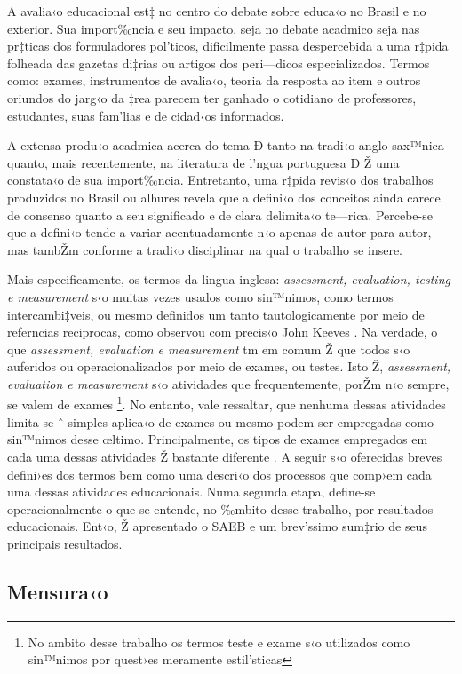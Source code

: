 \documentclass[a4paper, 12pt]{article}
\begin{document}
A avalia‹o educacional est‡ no centro do debate sobre educa‹o no Brasil e no exterior. Sua import‰ncia e seu impacto, seja no debate acadmico seja nas pr‡ticas dos formuladores pol’ticos, dificilmente passa despercebida a uma r‡pida folheada das gazetas di‡rias ou artigos dos peri—dicos especializados. Termos como: exames, instrumentos de avalia‹o, teoria da resposta ao item e outros oriundos do jarg‹o da ‡rea parecem ter ganhado o cotidiano de professores, estudantes, suas fam’lias e de cidad‹os informados. 

A extensa produ‹o acadmica acerca do tema Ð tanto na tradi‹o anglo-sax™nica quanto, mais recentemente, na literatura de l’ngua portuguesa Ð Ž uma constata‹o de sua import‰ncia. Entretanto, uma r‡pida revis‹o dos trabalhos produzidos no Brasil ou alhures revela que a defini‹o dos conceitos ainda carece de consenso quanto a seu significado e de clara delimita‹o te—rica. Percebe-se que a defini‹o tende a variar acentuadamente n‹o apenas de autor para autor, mas tambŽm conforme a tradi‹o disciplinar na qual o trabalho se insere.

Mais especificamente, os termos da lingua inglesa: \emph{assessment, evaluation, testing e measurement} s‹o muitas vezes usados como sin™nimos, como termos intercambi‡veis, ou mesmo definidos um tanto tautologicamente por meio de referncias reciprocas, como observou com precis‹o John Keeves \citeyear{keeves_educational_1997}. Na verdade, o que \emph{assessment, evaluation e measurement} tm em comum Ž que todos s‹o auferidos ou operacionalizados por meio de exames, ou testes. Isto Ž, \emph{assessment, evaluation e measurement} s‹o atividades que frequentemente, porŽm n‹o sempre, se valem de exames \footnote{No ambito desse trabalho os termos teste e exame s‹o utilizados como sin™nimos por quest›es meramente estil’sticas}. No entanto, vale ressaltar, que nenhuma dessas atividades limita-se ˆ simples aplica‹o de exames ou mesmo podem ser empregadas como sin™nimos desse œltimo. Principalmente, os tipos de exames empregados em cada uma dessas atividades Ž bastante diferente \cite{weiss_evaluation_1988}. A seguir s‹o oferecidas breves defini›es dos termos bem como uma descri‹o dos processos que comp›em cada uma dessas atividades educacionais. Numa segunda etapa, define-se operacionalmente o que se entende, no ‰mbito desse trabalho, por resultados educacionais. Ent‹o, Ž apresentado o SAEB e um brev’ssimo sum‡rio de seus principais resultados.

   
\subsection{Mensura‹o}	
\end{document}
